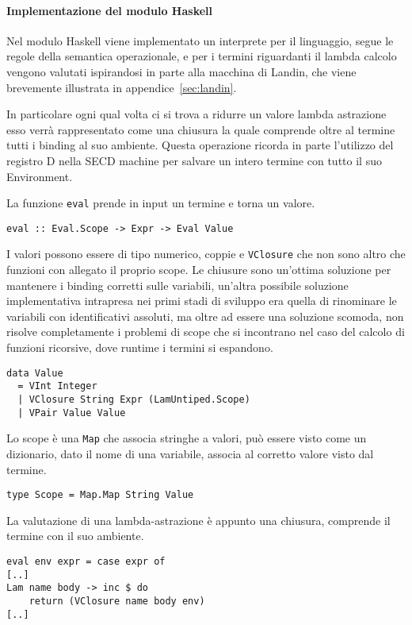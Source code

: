 \documentclass{article}
\begin{document}
\paragraph{Implementazione del modulo Haskell}
Nel modulo Haskell viene implementato un interprete per il linguaggio, segue le regole della semantica operazionale, e per i termini riguardanti il lambda calcolo vengono valutati ispirandosi in parte alla macchina di Landin, che viene brevemente illustrata in appendice~\ref{sec:landin}.

In particolare ogni qual volta ci si trova a ridurre un valore lambda astrazione esso verrà rappresentato come una chiusura la quale comprende oltre al termine tutti i binding al suo ambiente. Questa operazione ricorda in parte l'utilizzo del registro D nella SECD machine per salvare un intero termine con tutto il suo Environment.

La funzione \texttt{eval} prende in input un termine e torna un valore.
\begin{verbatim}
eval :: Eval.Scope -> Expr -> Eval Value
\end{verbatim}

I valori possono essere di tipo numerico, coppie e \texttt{VClosure} che non sono altro che funzioni con allegato il proprio scope. Le chiusure sono un'ottima soluzione per mantenere i binding corretti sulle variabili, un'altra possibile soluzione implementativa intrapresa nei primi stadi di sviluppo era quella di rinominare le variabili con identificativi assoluti, ma oltre ad essere una soluzione scomoda, non risolve completamente i problemi di scope che si incontrano nel caso del calcolo di funzioni ricorsive, dove runtime i termini si espandono.

\begin{verbatim}
data Value
  = VInt Integer
  | VClosure String Expr (LamUntiped.Scope)
  | VPair Value Value
\end{verbatim}

Lo scope è una \texttt{Map} che associa stringhe a valori, può essere visto come un dizionario, dato il nome di una variabile, associa al corretto valore visto dal termine.

\begin{verbatim}
type Scope = Map.Map String Value
\end{verbatim}

La valutazione di una lambda-astrazione è appunto una chiusura, comprende il termine con il suo ambiente.

\begin{verbatim}
eval env expr = case expr of
[..]
Lam name body -> inc $ do
    return (VClosure name body env)
[..]
\end{verbatim}
\end{document}
